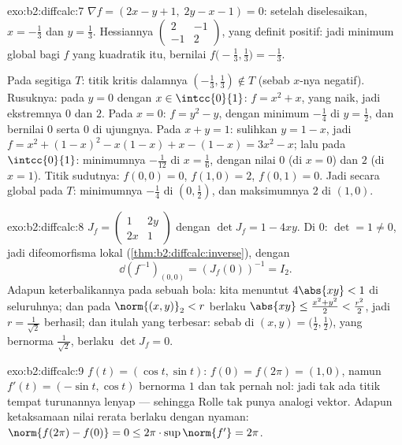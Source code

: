 \begin{solution}{exo:b2:diffcalc:7}
$\nabla f = (2x - y + 1,\; 2y - x - 1) = 0$: setelah diselesaikan, $x =
-\frac13$ dan $y = \frac13$. Hessiannya $\begin{pmatrix} 2 & -1\\ -1 &
2\end{pmatrix}$, yang definit positif: jadi minimum global bagi $f$ yang
kuadratik itu, bernilai $f\bigl(-\frac13, \frac13\bigr) = -\frac13$.

Pada segitiga $T$: titik kritis dalamnya $(-\frac13,
\frac13) \notin T$ (sebab $x$-nya negatif). Rusuknya: pada $y = 0$ dengan $x \in
\intcc{0}{1}$: $f = x^2 + x$, yang naik, jadi ekstremnya $0$ dan $2$. Pada
$x = 0$: $f = y^2 - y$, dengan minimum $-\frac14$ di $y = \frac12$, dan bernilai
$0$ serta $0$ di ujungnya. Pada $x + y = 1$: sulihkan $y = 1 - x$, jadi
$f = x^2 + (1-x)^2 - x(1-x) + x - (1-x) = 3x^2 - x$; lalu pada
$\intcc{0}{1}$: minimumnya $-\frac{1}{12}$ di $x = \frac16$, dengan nilai
$0$ (di $x=0$) dan $2$ (di $x=1$). Titik sudutnya: $f(0,0) = 0$, $f(1,0)
= 2$, $f(0,1) = 0$. Jadi secara global pada $T$: minimumnya $-\frac14$ di $(0,
\frac12)$, dan maksimumnya $2$ di $(1, 0)$.
\end{solution}

\begin{solution}{exo:b2:diffcalc:8}
$J_f = \begin{pmatrix} 1 & 2y\\ 2x & 1\end{pmatrix}$ dengan $\det J_f =
1 - 4xy$. Di $0$: $\det = 1 \neq 0$, jadi difeomorfisma lokal
(\cref{thm:b2:diffcalc:inverse}), dengan
\[
\dd(f^{-1})_{(0,0)} = (J_f(0))^{-1} = I_2 .
\]
Adapun keterbalikannya pada sebuah bola: kita menuntut $4\abs{xy} < 1$ di seluruhnya; dan pada
$\norm{(x,y)}_2 < r$ berlaku $\abs{xy} \leq \frac{x^2 + y^2}{2} <
\frac{r^2}{2}$, jadi $r = \frac{1}{\sqrt2}$ berhasil; dan itulah yang terbesar:
sebab di $(x, y) = \bigl(\tfrac12, \tfrac12\bigr)$, yang bernorma
$\frac{1}{\sqrt2}$, berlaku $\det J_f = 0$.
\end{solution}

\begin{solution}{exo:b2:diffcalc:9}
$f(t) = (\cos t, \sin t)$: $f(0) = f(2\pi) = (1, 0)$, namun $f'(t) =
(-\sin t, \cos t)$ bernorma $1$ dan tak pernah nol: jadi tak ada titik tempat
turunannya lenyap --- sehingga Rolle tak punya analogi vektor. Adapun ketaksamaan
nilai rerata berlaku dengan nyaman: $\norm{f(2\pi) - f(0)} = 0 \leq
2\pi \cdot \sup\norm{f'} = 2\pi$.
\end{solution}

